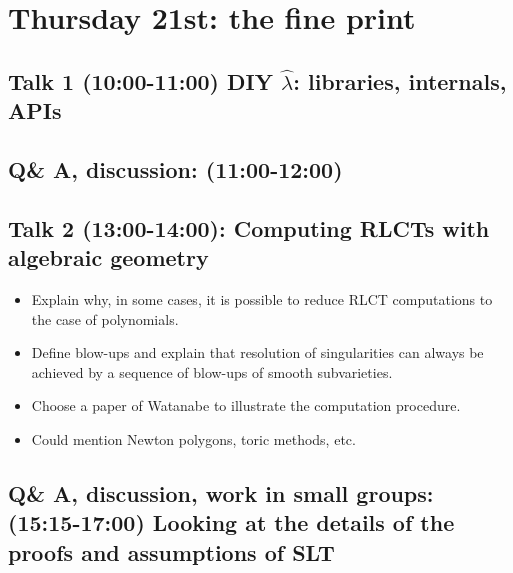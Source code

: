 \documentclass[a4paper,11pt]{amsart}
\newcommand{\lambdahat}{\widehat{\lambda}}
\begin{document}
\section*{Thursday 21st: the fine print}

\subsection*{Talk 1 (10:00-11:00) DIY $\lambdahat$: libraries, internals, APIs}

\subsection*{Q\& A, discussion: (11:00-12:00)}

\subsection*{Talk 2 (13:00-14:00): Computing RLCTs with algebraic geometry}

\begin{itemize}
\item Explain why, in some cases, it is possible to reduce RLCT computations to the case of polynomials.
\item Define blow-ups and explain that resolution of singularities can always be achieved by a sequence of blow-ups of smooth subvarieties.  
\item Choose a paper of Watanabe to illustrate the computation procedure.
\item Could mention Newton polygons, toric methods, etc.
\end{itemize}

\subsection*{Q\& A, discussion, work in small groups: (15:15-17:00) Looking at the details of the proofs and assumptions of SLT}
\end{document}
